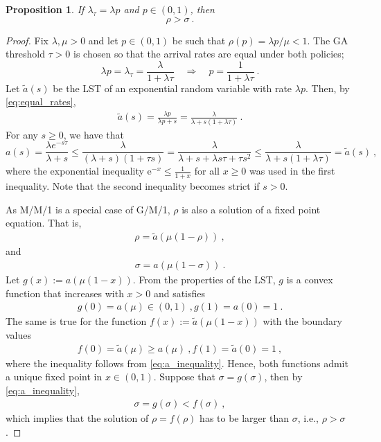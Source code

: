 \documentclass[11pt]{article}
\newtheorem{proposition}[theorem]{Proposition}
\def\e{\mathrm{e}}
\begin{document}
\begin{proposition}\label{prop:rho_dominant}
 If $\lambda_\tau=\lambda p$ and $p\in(0,1)$, then
 \begin{equation}\label{eq:rho_dominant}
      \rho>\sigma\ .
\end{equation}
\end{proposition}
\begin{proof}
Fix $\lambda,\mu>0$ and let $p\in(0,1)$ be such that $\rho(p)=\lambda p/\mu<1$. The GA threshold $\tau> 0$ is chosen so that the arrival rates are equal under both policies;
\begin{equation}\label{eq:equal_rates}
    \lambda p=\lambda_\tau=\frac{\lambda}{1+\lambda\tau}\quad\Longrightarrow\quad
p=\frac{1}{1+\lambda\tau}\ .
\end{equation}
Let $\tilde a(s)$ be the LST of an exponential random variable with rate $\lambda p$. Then, by \eqref{eq:equal_rates},
\begin{align*}
\tilde a(s)=\frac{\lambda p}{\lambda p+s}=\frac{\lambda}{\lambda+s(1+\lambda\tau)} \ .
\end{align*}
For any $s\geq 0$, we have that
\begin{equation}\label{eq:a_inequality}
    a(s)=\frac{\lambda e^{-s\tau}}{\lambda+s}
\leq \frac{\lambda}{(\lambda+s)(1+\tau s)}=\frac{\lambda}{\lambda+s+\lambda s\tau+\tau s^2}
\leq \frac{\lambda}{\lambda+s(1+\lambda\tau)}= \tilde a(s)\ ,
\end{equation}
where the exponential inequality $\e^{-x}\leq \frac{1}{1+x}$ for all $x\geq 0$ was used in the first inequality. Note that the second inequality becomes strict if $s>0$.

As M/M/1 is a special case of G/M/1, $\rho$ is also a solution of a fixed point equation. That is,
\begin{align*}
    \rho=\tilde{a}(\mu(1-\rho))\ ,
\end{align*}
and 
\begin{align*}
    \sigma=a(\mu(1-\sigma))\ .
\end{align*}
Let $g(x):=a(\mu(1-x))$. From the properties of the LST, $g$ is a convex function that increases with $x>0$ and satisfies
\begin{align*}
    g(0)=a(\mu)\in(0,1)\  , g(1)=a(0)=1\ .
\end{align*}
The same is true for the function $f(x):=\tilde{a}(\mu(1-x))$ with the boundary values
\begin{align*}
    f(0)=\tilde{a}(\mu)\geq a(\mu)\  , f(1)=\tilde{a}(0)=1\ ,
\end{align*}
where the inequality follows from \eqref{eq:a_inequality}.
Hence, both functions admit a unique fixed point in $x\in(0,1)$. Suppose that $\sigma=g(\sigma)$, then by \eqref{eq:a_inequality},
\begin{align*}
    \sigma=g(\sigma)<f(\sigma)\ ,
\end{align*}
which implies that the solution of $\rho=f(\rho)$ has to be larger than $\sigma$, i.e., $\rho>\sigma$. 
\end{proof}
\end{document}
